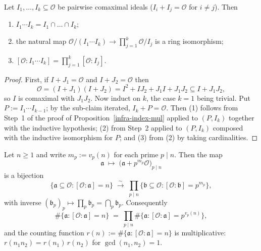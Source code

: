 \begin{lemma}\label{infra-index-family}
  Let $I_1, \dots, I_k \subseteq \mathcal{O}$ be pairwise comaximal ideals
  ($I_i + I_j = \mathcal{O}$ for $i \ne j$). Then
  \begin{enumerate}
    \item $I_1 \cdots I_k = I_1 \cap \dots \cap I_k$;
    \item the natural map
      $\mathcal{O}/(I_1 \cdots I_k) \to \prod_{j=1}^{k} \mathcal{O}/I_j$ is a ring
      isomorphism;
    \item $[\mathcal{O} : I_1 \cdots I_k] = \prod_{j=1}^{k} [\mathcal{O} : I_j]$.
  \end{enumerate}
\end{lemma}

\begin{proof}
  First, if $I + J_1 = \mathcal{O}$ and $I + J_2 = \mathcal{O}$ then
  \[
    \mathcal{O} = (I + J_1)(I + J_2)
    = I^2 + IJ_2 + J_1 I + J_1 J_2 \subseteq I + J_1 J_2,
  \]
  so $I$ is comaximal with $J_1 J_2$. Now induct on $k$, the case $k = 1$ being trivial. Put
  $P := I_1 \cdots I_{k-1}$; by the sub-claim iterated, $I_k + P = \mathcal{O}$. Then (1)
  follows from Step~1 of the proof of Proposition~\ref{infra-index-mul} applied to
  $(P, I_k)$ together with the inductive hypothesis; (2) from Step~2 applied to $(P, I_k)$
  composed with the inductive isomorphism for $P$; and (3) from (2) by taking cardinalities.
\end{proof}

\begin{theorem}\label{infra-index-count}
  \leanok
  Let $n \ge 1$ and write $m_p := v_p(n)$ for each prime $p \mid n$. Then the map
  \[
    \mathfrak{a} \;\longmapsto\; \bigl(\mathfrak{a} + p^{m_p}\mathcal{O}\bigr)_{p \mid n}
  \]
  is a bijection
  \[
    \{\mathfrak{a} \subseteq \mathcal{O} : [\mathcal{O} : \mathfrak{a}] = n\}
    \;\xrightarrow{\ \sim\ }\;
    \prod_{p \mid n} \{\mathfrak{b} \subseteq \mathcal{O} :
      [\mathcal{O} : \mathfrak{b}] = p^{m_p}\},
  \]
  with inverse $(\mathfrak{b}_p)_p \mapsto \prod_p \mathfrak{b}_p = \bigcap_p \mathfrak{b}_p$.
  Consequently
  \[
    \#\{\mathfrak{a} : [\mathcal{O} : \mathfrak{a}] = n\}
    \;=\; \prod_{p \mid n} \#\{\mathfrak{a} :
      [\mathcal{O} : \mathfrak{a}] = p^{v_p(n)}\},
  \]
  and the counting function
  $r(n) := \#\{\mathfrak{a} : [\mathcal{O} : \mathfrak{a}] = n\}$ is multiplicative:
  $r(n_1 n_2) = r(n_1)\,r(n_2)$ for $\gcd(n_1, n_2) = 1$.
\end{theorem}

